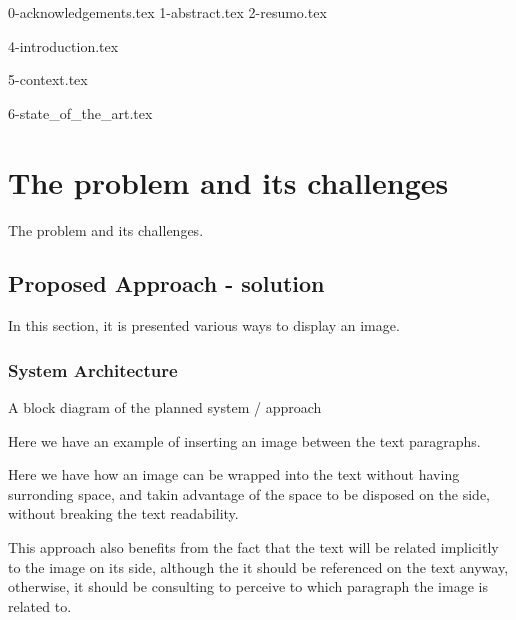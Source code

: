 \documentclass[oneside,11pt,a4paper,footinclude=true,headinclude=true,cleardoublepage=empty]{scrbook}
\author{Miguel António Ferrão Brito}
\date{\myear} %
\begin{document}
	\umfrontcover	
	\umtitlepage
	
	{0-acknowledgements.tex}
	{1-abstract.tex}
	\cleardoublepage
	{2-resumo.tex}
	
	\tableofcontents
	\listoffigures
	\listoftables
	\printglossary[type=\acronymtype]
	\clearpage
	\thispagestyle{empty}

	

	{4-introduction.tex}
	
	{5-context.tex}
        
	{6-state_of_the_art.tex}


	\chapter{The problem and its challenges}
	         The problem and its challenges.

	\section{Proposed Approach - solution}
	In this section, it is presented various ways to display an image.
     \subsection{System Architecture}
     A block diagram of the planned system / approach

	Here we have an example of inserting an image between the text paragraphs.
	\begin{center}
	\end{center}

	Here we have how an image can be wrapped into the text without having surronding space, and takin advantage of the space to be disposed on the side, without breaking the text readability.

	This approach also benefits from the fact that the text will be related implicitly to the image on its side, although the it should be referenced on the text anyway, otherwise, it should be consulting to perceive to which paragraph the image is related to.
\end{document}
